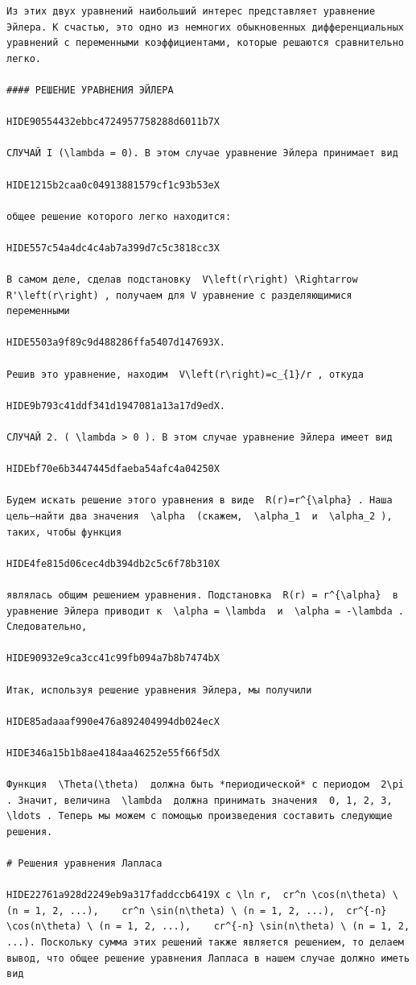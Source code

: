 \documentclass[
  ukrainian,
]{article}
\begin{document}
\begin{verbatim}
Из этих двух уравнений наибольший интерес представляет уравнение Эйлера. К счастью, это одно из немногих обыкновенных дифференциальных уравнений с переменными коэффициентами, которые решаются сравнительно легко.

#### РЕШЕНИЕ УРАВНЕНИЯ ЭЙЛЕРА

HIDE90554432ebbc4724957758288d6011b7X

СЛУЧАЙ I (\lambda = 0). В этом случае уравнение Эйлера принимает вид

HIDE1215b2caa0c04913881579cf1c93b53eX

общее решение которого легко находится:

HIDE557c54a4dc4c4ab7a399d7c5c3818cc3X

В самом деле, сделав подстановку  V\left(r\right) \Rightarrow R'\left(r\right) , получаем для V уравнение с разделяющимися переменными

HIDE5503a9f89c9d488286ffa5407d147693X.

Решив это уравнение, находим  V\left(r\right)=c_{1}/r , откуда

HIDE9b793c41ddf341d1947081a13a17d9edX.

СЛУЧАЙ 2. ( \lambda > 0 ). В этом случае уравнение Эйлера имеет вид

HIDEbf70e6b3447445dfaeba54afc4a04250X

Будем искать решение этого уравнения в виде  R(r)=r^{\alpha} . Наша цель—найти два значения  \alpha  (скажем,  \alpha_1  и  \alpha_2 ), таких, чтобы функция

HIDE4fe815d06cec4db394db2c5c6f78b310X

являлась общим решением уравнения. Подстановка  R(r) = r^{\alpha}  в уравнение Эйлера приводит к  \alpha = \lambda  и  \alpha = -\lambda . Следовательно,

HIDE90932e9ca3cc41c99fb094a7b8b7474bX

Итак, используя решение уравнения Эйлера, мы получили

HIDE85adaaaf990e476a892404994db024ecX

HIDE346a15b1b8ae4184aa46252e55f66f5dX

Функция  \Theta(\theta)  должна быть *периодической* с периодом  2\pi . Значит, величина  \lambda  должна принимать значения  0, 1, 2, 3, \ldots . Теперь мы можем с помощью произведения составить следующие решения.

# Решения уравнения Лапласа

HIDE22761a928d2249eb9a317faddccb6419X c \ln r,  cr^n \cos(n\theta) \ (n = 1, 2, ...),    cr^n \sin(n\theta) \ (n = 1, 2, ...),  cr^{-n} \cos(n\theta) \ (n = 1, 2, ...),    cr^{-n} \sin(n\theta) \ (n = 1, 2, ...). Поскольку сумма этих решений также является решением, то делаем вывод, что общее решение уравнения Лапласа в нашем случае должно иметь вид


\end{verbatim}
\end{document}
